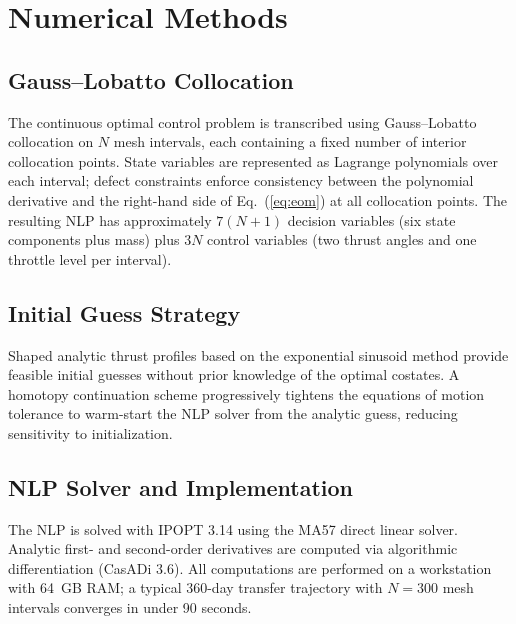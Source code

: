 \section{Numerical Methods}
\label{sec:methods}

\subsection{Gauss--Lobatto Collocation}

The continuous optimal control problem is transcribed using Gauss–Lobatto
collocation on $N$ mesh intervals, each containing a fixed number of interior
collocation points.  State variables are represented as Lagrange polynomials
over each interval; defect constraints enforce consistency between the polynomial
derivative and the right-hand side of Eq.~(\ref{eq:eom}) at all collocation
points.  The resulting NLP has approximately $7(N+1)$ decision variables (six
state components plus mass) plus $3N$ control variables (two thrust angles and
one throttle level per interval).

\subsection{Initial Guess Strategy}

Shaped analytic thrust profiles based on the exponential sinusoid method
\cite{wall2009} provide feasible initial guesses without prior knowledge of
the optimal costates.  A homotopy continuation scheme progressively tightens
the equations of motion tolerance to warm-start the NLP solver from the analytic
guess, reducing sensitivity to initialization.

\subsection{NLP Solver and Implementation}

The NLP is solved with IPOPT 3.14 using the MA57 direct linear solver.  Analytic
first- and second-order derivatives are computed via algorithmic differentiation
(CasADi 3.6).  All computations are performed on a workstation with 64~GB RAM;
a typical 360-day transfer trajectory with $N = 300$ mesh intervals converges
in under 90 seconds.

